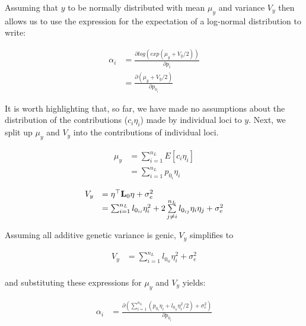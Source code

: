 \documentclass[12pt]{article}
\begin{document}
\begin{bibunit}
Assuming that $y$ to be normally distributed with mean ${\mu_y}$ and variance $V_y$ then allows us to use the expression for the expectation of a log-normal distribution to write:

\begin{equation}
\begin{array}{rl}
\alpha_i&= \frac{\partial log(exp(\mu_y + {V_y}/2 ))}{\partial p_i} \\
&= \frac{\partial (\mu_y + {V_y}/2 )}{\partial p_{0_i}}
\end{array}
\end{equation}

It is worth highlighting that, so far, we have made no assumptions about the distribution of the contributions ($c_{i}\eta_{i}$) made by individual loci to $y$. Next, we split up $\mu_y$ and $V_y$ into the contributions of individual loci.

\begin{equation}
\begin{array}{rl}
\mu_y &= \sum_{i=1}^{n_L} E[c_i \eta_i] \\
&= \sum_{i=1}^{n_L} p_{0_i} \eta_i
\end{array}
\end{equation}

\begin{equation}
\begin{array}{rl}
V_y &= {\bf \eta}^{\top}{\bf L}_{0}{\bf \eta} + \sigma^2_e\\
&= \sum_{i=1}^{n_L} l_{0_{ii}}\eta^2_{i} + 2\sum\limits_{j \neq i}^{n_L} l_{0_{ij}} \eta_i \eta_j  + \sigma^2_e\\
\end{array}
\end{equation}

Assuming all additive genetic variance is genic, $V_y$  simplifies to 

\begin{equation}
\begin{array}{rl}
V_y
&= \sum_{i=1}^{n_L} l_{0_{ii}}\eta^2_{i} + \sigma^2_e\\
\end{array}
\end{equation}

and substituting these expressions for $\mu_y$ and $V_y$ yields:

\begin{equation}
\begin{array}{rl}
\alpha_i&=\frac{\partial \left(\sum_{i=1}^{n_L}(p_{0_i} \eta_i+l_{0_{ii}}\eta^2_{i}/2) + \sigma^2_e\right)}{\partial p_{0_i}}\\
\end{array}
\end{equation}



\end{bibunit}
\end{document}
